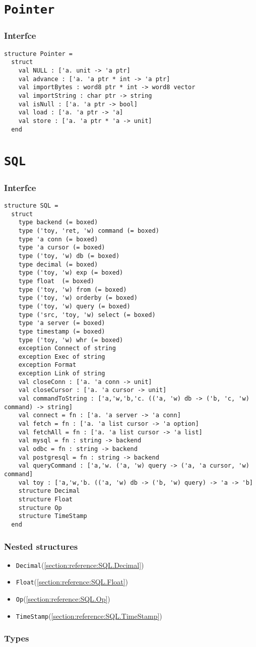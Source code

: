 \documentclass{jbook}
\makeatletter
\newcommand{\txt}[2]{#2}
\newcommand{\code}[1]{\mbox{\large\tt #1}}
\newcommand{\structure}[1]{
\section{{\tt #1}}\label{section:reference:#1}
}
\newcommand{\DECL}[2]{
 \medskip\noindent
 {\tt #1\begin{tabular}[t]{@{}l@{}l}#2\end{tabular}\par}
}
\newcommand{\sigref}[1]{\ref{section:reference:#1}}
\newcommand{\optype}[2]{\DECL{type~#1~(=~}{#2)}}
\newcommand{\Types}{\subsubsection*{\txt{型}{Types}}}
\newcommand{\Interface}{\subsubsection*{\txt{インタフェイス}{Interfce}}}
\newcommand{\NestedStructures}{\subsubsection*{\txt{ネストしたストラクチャ}{Nested structures}}}
\makeatother
\begin{document}
\structure{Pointer}
\Interface
\begin{verbatim}
structure Pointer =
  struct
    val NULL : ['a. unit -> 'a ptr]
    val advance : ['a. 'a ptr * int -> 'a ptr]
    val importBytes : word8 ptr * int -> word8 vector
    val importString : char ptr -> string
    val isNull : ['a. 'a ptr -> bool]
    val load : ['a. 'a ptr -> 'a]
    val store : ['a. 'a ptr * 'a -> unit]
  end
\end{verbatim}

\structure{SQL}
\Interface

\begin{verbatim}
structure SQL =
  struct
    type backend (= boxed)
    type ('toy, 'ret, 'w) command (= boxed)
    type 'a conn (= boxed)
    type 'a cursor (= boxed)
    type ('toy, 'w) db (= boxed)
    type decimal (= boxed)
    type ('toy, 'w) exp (= boxed)
    type float  (= boxed)
    type ('toy, 'w) from (= boxed)
    type ('toy, 'w) orderby (= boxed)
    type ('toy, 'w) query (= boxed)
    type ('src, 'toy, 'w) select (= boxed)
    type 'a server (= boxed)
    type timestamp (= boxed)
    type ('toy, 'w) whr (= boxed)
    exception Connect of string
    exception Exec of string
    exception Format
    exception Link of string
    val closeConn : ['a. 'a conn -> unit]
    val closeCursor : ['a. 'a cursor -> unit]
    val commandToString : ['a,'w,'b,'c. (('a, 'w) db -> ('b, 'c, 'w) command) -> string]
    val connect = fn : ['a. 'a server -> 'a conn]
    val fetch = fn : ['a. 'a list cursor -> 'a option]
    val fetchAll = fn : ['a. 'a list cursor -> 'a list]
    val mysql = fn : string -> backend
    val odbc = fn : string -> backend
    val postgresql = fn : string -> backend
    val queryCommand : ['a,'w. ('a, 'w) query -> ('a, 'a cursor, 'w) command]
    val toy : ['a,'w,'b. (('a, 'w) db -> ('b, 'w) query) -> 'a -> 'b]
    structure Decimal
    structure Float
    structure Op
    structure TimeStamp
  end
\end{verbatim}
\NestedStructures

\begin{itemize}
\item \code{Decimal}(\sigref{SQL.Decimal})
\item \code{Float}(\sigref{SQL.Float})
\item \code{Op}(\sigref{SQL.Op})
\item \code{TimeStamp}(\sigref{SQL.TimeStamp})
\end{itemize}


\Types

\end{document}
